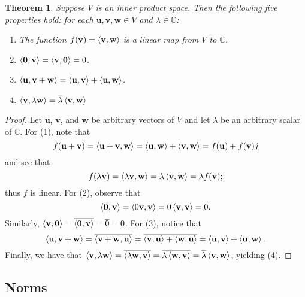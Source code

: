 \documentclass[11pt]{article}
\renewcommand{\vec}[1]{\mathbf{#1}}
\newcommand{\conjugate}[1]{\overline{#1}}
\newtheorem{theorem}{Theorem}
\begin{document}
\begin{adjustwidth}{0.5cm}{}
  \begin{theorem}
	  Suppose $V$ is an inner product space. Then the following five properties hold: for each $\vec{u}, \vec{v}, \vec{w} \in V$ and $\lambda \in \mathbb{C}$:
	  \begin{enumerate}
		  \item The function $f(\vec{v}) = \ev{\vec{v}, \vec{w}}$ is a linear map from $V$ to $\mathbb{C}$.
		  \item $\ev{\vec{0}, \vec{v}} = \ev{\vec{v}, \vec{0}} = 0$.
		  \item $\ev{\vec{u}, \vec{v} + \vec{w}} = \ev{\vec{u}, \vec{v}} + \ev{\vec{u}, \vec{w}}$.
		  \item $\ev{\vec{v}, \lambda \vec{w}} = \conjugate{\lambda} \ev{\vec{v}, \vec{w}}$
	  \end{enumerate}
  \end{theorem}
	\begin{proof}
		Let $\vec{u}$, $\vec{v}$, and $\vec{w}$ be arbitrary vectors of $V$ and let $\lambda$ be an arbitrary scalar of $\mathbb{C}$. For (1), note that
		\[
			f(\vec{u} + \vec{v}) = \ev{\vec{u} + \vec{v}, \vec{w}} = \ev{\vec{u}, \vec{w}} + \ev{\vec{v}, \vec{w}} = f(\vec{u}) + f(\vec{v})j
		\]
		and see that
		\[
			f(\lambda \vec{v}) = \ev{\lambda \vec{v}, \vec{w}} = \lambda \ev{\vec{v}, \vec{w}} = \lambda f(\vec{v});
		\]
		thus $f$ is linear. For (2), observe that
		\[
			\ev{\vec{0}, \vec{v}} = \ev{0 \vec{v}, \vec{v}} = 0 \ev{\vec{v}, \vec{v}} = 0.
		\]
		Similarly, $\ev{\vec{v}, \vec{0}} = \conjugate{\ev{\vec{0}, \vec{v}}} = \conjugate{0} = 0$. For (3), notice that
		\[
			\ev{\vec{u}, \vec{v} + \vec{w}} = \conjugate{\ev{\vec{v} + \vec{w}, \vec{u}}} = \conjugate{\ev{\vec{v}, \vec{u}} + \ev{\vec{w}, \vec{u}}} = \ev{\vec{u}, \vec{v}} + \ev{\vec{u}, \vec{w}}.
		\]
		Finally, we have that $\ev{\vec{v}, \lambda \vec{w}} = \conjugate{\ev{\lambda \vec{w}, \vec{v}}} = \conjugate{\lambda \ev{\vec{w}, \vec{v}}} = \conjugate{\lambda} \ev{\vec{v}, \vec{w}}$, yielding (4).
	\end{proof}
\end{adjustwidth}


\subsection{Norms}
\end{document}
